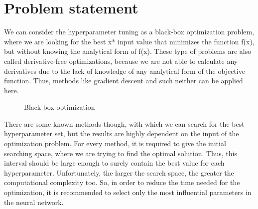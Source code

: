 \documentclass[conference]{IEEEtran}
\begin{document}
\section{Problem statement}
We can consider the hyperparameter tuning as a black-box optimization problem, where we are looking for the best x* input value that minimizes the function f(x), but without knowing the analytical form of f(x). These type of problems are also called derivative-free optimizations, because we are not able to calculate any derivatives due to the lack of knowledge of any analytical form of the objective function. Thus, methods like gradient descent and such neither can be applied here.
\begin{figure}[!ht]
		\centering
{}
		\caption{Black-box optimization}
		\label{fig:simu_architecture}
\end{figure}

There are some known methods though, with which we can search for the best hyperparameter set, but the results are highly dependent on the input of the optimization problem. For every method, it is required to give the initial searching space, where we are trying to find the optimal solution. Thus, this interval should be large enough to surely contain the best value for each hyperparameter.
Unfortunately, the larger the search space, the greater the computational complexity too. So, in order to reduce the time needed for the optimization, it is recommended to select only the most influential parameters in the neural network.
\end{document}
